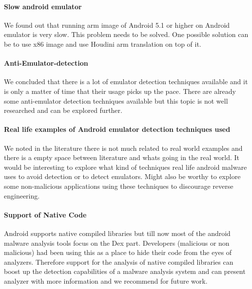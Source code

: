 \documentclass[../main.tex]{subfile}
\begin{document}
\paragraph{Slow android emulator} We found out that running arm image of Android 5.1 or higher on Android emulator is very slow. This problem needs to be solved. One possible solution can be to use x86 image and use Houdini arm translation on top of it.
\paragraph{Anti-Emulator-detection} We concluded that there is a lot of emulator detection techniques available and it is only a matter of time that their usage picks up the pace. There are already some anti-emulator detection techniques available but this topic is not well researched and can be explored further.
\paragraph{Real life examples of Android emulator detection techniques used} We noted in the literature there is not much related to real world examples and there is a empty space between literature and whats going in the real world. It would be interesting to explore what kind of techniques real life android malware uses to avoid detection or to detect emulators. Might also be worthy to explore some non-malicious applications using these techniques to discourage reverse engineering.
\paragraph{Support of Native Code} Android supports native compiled libraries but till now most of the android malware analysis tools focus on the Dex part. Developers (malicious or non malicious) had been using this as a place to hide their code from the eyes of analyzers. Therefore support for the analysis of native compiled libraries can boost up the detection capabilities of a malware analysis system and can present analyzer with more information and we recommend for future work.
\end{document}
